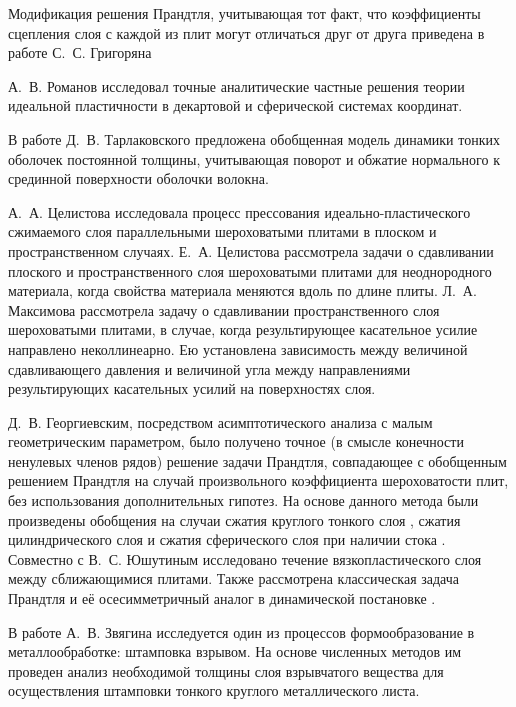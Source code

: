 Модификация решения Прандтля, учитывающая тот факт, что коэффициенты сцепления слоя с каждой из плит могут отличаться друг от друга приведена в работе С.~С. Григоряна \autocite{Grigoryan:1981} 

А.~В. Романов \autocite{Romanov:1982,Romanov:1984} исследовал точные аналитические частные решения теории идеальной пластичности в декартовой и сферической системах координат.

В работе Д.~В. Тарлаковского \autocite{Tarlakovskiy:2018} предложена обобщенная модель динамики тонких оболочек постоянной толщины, учитывающая поворот и обжатие нормального к срединной поверхности оболочки волокна.

А.~А. Целистова \autocite{Tselistova:1999} исследовала процесс прессования идеально-пластического сжимаемого слоя параллельными шероховатыми плитами в плоском и пространственном случаях.
Е.~А. Целистова \autocite{Tselistova:2000} рассмотрела задачи о сдавливании плоского и пространственного слоя шероховатыми плитами для неоднородного материала, когда свойства материала меняются вдоль по длине плиты.
Л.~А. Максимова \autocite{Maximova:1999} рассмотрела задачу о сдавливании пространственного слоя шероховатыми плитами, в случае, когда результирующее касательное усилие направлено неколлинеарно. Ею установлена зависимость между величиной сдавливающего давления и величиной угла между направлениями результирующих касательных усилий на поверхностях слоя.

Д.~В. Георгиевским, посредством асимптотического анализа с малым геометрическим параметром, было получено точное (в смысле конечности ненулевых членов рядов) решение \autocite{Georgievsky:2009} задачи Прандтля, совпадающее с обобщенным решением Прандтля на случай произвольного коэффициента шероховатости плит, без использования дополнительных гипотез. На основе данного метода были произведены обобщения на случаи сжатия круглого тонкого слоя \autocite{Georgievsky:2008}, сжатия цилиндрического слоя \autocite{Georgievsky:2010} и сжатия сферического слоя при наличии стока \autocite{Georgievsky:2011}. Совместно с В.~С. Юшутиным \autocite{Georgievsky:2012} исследовано течение вязкопластического слоя между сближающимися плитами. Также рассмотрена классическая задача Прандтля и её осесимметричный аналог в динамической постановке \autocite{Georgievsky:2013}.

В работе А.~В. Звягина \autocite{Zvyagin:1990} исследуется один из процессов формообразование в металлообработке: штамповка взрывом. На основе численных методов им проведен анализ необходимой толщины слоя взрывчатого вещества для осуществления штамповки тонкого круглого металлического листа.

